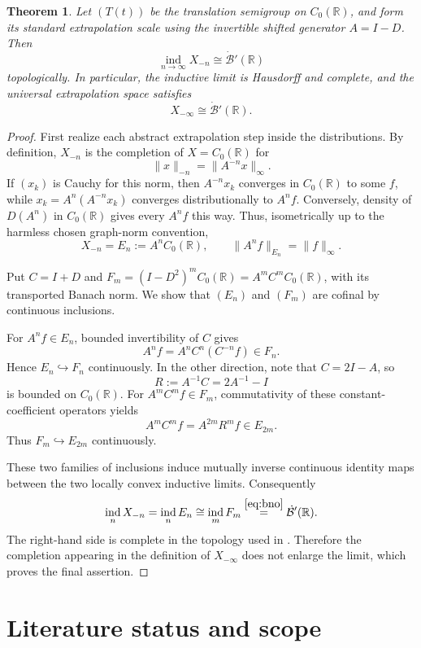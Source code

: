 \documentclass[10pt]{article}
\newtheorem{theorem}{Theorem}
\newcommand{\Czero}{C_0(\mathbb R)}
\newcommand{\Bdot}{\dot{\mathcal B}'(\mathbb R)}
\newcommand{\indlim}{\mathop{\mathrm{ind}}\limits}
\begin{document}
\begin{theorem}
Let $(T(t))$ be the translation semigroup on $\Czero$, and form its standard
extrapolation scale using the invertible shifted generator $A=I-D$.  Then
\[
 \indlim_{n\to\infty}X_{-n}\cong\Bdot
\]
topologically.  In particular, the inductive limit is Hausdorff and complete,
and the universal extrapolation space satisfies
\[
 X_{-\infty}\cong\Bdot.
\]
\end{theorem}

\begin{proof}
First realize each abstract extrapolation step inside the distributions.  By
definition, $X_{-n}$ is the completion of $X=\Czero$ for
\[
 \|x\|_{-n}=\|A^{-n}x\|_\infty.
\]
If $(x_k)$ is Cauchy for this norm, then $A^{-n}x_k$ converges in $\Czero$ to
some $f$, while $x_k=A^n(A^{-n}x_k)$ converges distributionally to $A^nf$.
Conversely, density of $D(A^n)$ in $\Czero$ gives every $A^nf$ this way.
Thus, isometrically up to the harmless chosen graph-norm convention,
\begin{equation}\label{eq:E}
 X_{-n}=E_n:=A^n\Czero,
 \qquad \|A^nf\|_{E_n}=\|f\|_\infty.
\end{equation}

Put $C=I+D$ and $F_m=(I-D^2)^m\Czero=A^mC^m\Czero$, with its transported
Banach norm.  We show that $(E_n)$ and $(F_m)$ are cofinal by continuous
inclusions.

For $A^nf\in E_n$, bounded invertibility of $C$ gives
\[
 A^nf=A^nC^n(C^{-n}f)\in F_n.
\]
Hence $E_n\hookrightarrow F_n$ continuously.  In the other direction, note
that $C=2I-A$, so
\[
 R:=A^{-1}C=2A^{-1}-I
\]
is bounded on $\Czero$.  For $A^mC^mf\in F_m$, commutativity of these
constant-coefficient operators yields
\[
 A^mC^mf=A^{2m}R^mf\in E_{2m}.
\]
Thus $F_m\hookrightarrow E_{2m}$ continuously.

These two families of inclusions induce mutually inverse continuous identity
maps between the two locally convex inductive limits.  Consequently
\[
 \indlim_n X_{-n}
 =\indlim_n E_n
 \cong\indlim_m F_m
 \overset{\eqref{eq:bno}}{=}\Bdot.
\]
The right-hand side is complete in the topology used in \cite{BNO}.  Therefore
the completion appearing in the definition of $X_{-\infty}$ does not enlarge
the limit, which proves the final assertion.
\end{proof}

\section*{Literature status and scope}
\end{document}
